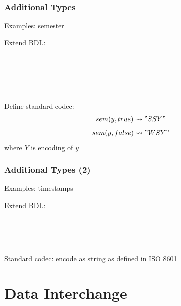 \documentclass{beamer}
\begin{document}
\begin{frame}\frametitle{Additional Types}
Examples: semester

Extend BDL:
\begin{commgrammar}
\\
\\
\\
\\
\end{commgrammar}

Define standard codec:
\[sem(y,true) \rightsquigarrow "SSY"\]
\[sem(y,false) \rightsquigarrow "WSY"\]
where $Y$ is encoding of $y$
\end{frame}

\begin{frame}\frametitle{Additional Types (2)}
Examples: timestamps

Extend BDL:
\begin{commgrammar}
\\
\\
\\
\end{commgrammar}

Standard codec: encode as string as defined in ISO 8601
\end{frame}

\section{Data Interchange}
\end{document}
